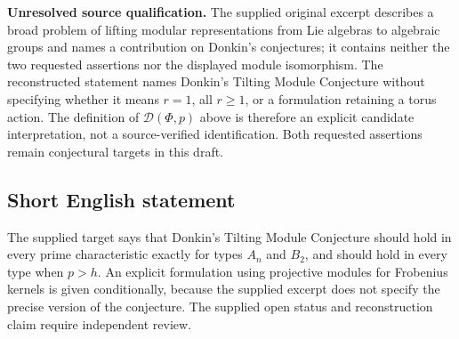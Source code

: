 \documentclass[11pt]{article}
\begin{document}
\textbf{Unresolved source qualification.} The supplied original excerpt describes a broad problem of lifting modular representations from Lie algebras to algebraic groups and names a contribution on Donkin's conjectures; it contains neither the two requested assertions nor the displayed module isomorphism. The reconstructed statement names Donkin's Tilting Module Conjecture without specifying whether it means \(r=1\), all \(r\geq1\), or a formulation retaining a torus action. The definition of \(\mathcal D(\Phi,p)\) above is therefore an explicit candidate interpretation, not a source-verified identification. Both requested assertions remain conjectural targets in this draft.
\subsection{Short English statement}
The supplied target says that Donkin's Tilting Module Conjecture should hold in every prime characteristic exactly for types \(A_n\) and \(B_2\), and should hold in every type when \(p>h\). An explicit formulation using projective modules for Frobenius kernels is given conditionally, because the supplied excerpt does not specify the precise version of the conjecture. The supplied open status and reconstruction claim require independent review.
\end{document}
